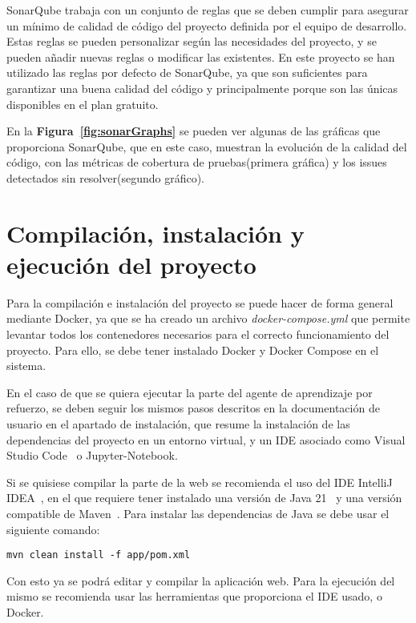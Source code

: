 SonarQube trabaja con un conjunto de reglas que se deben cumplir para asegurar un mínimo de calidad de código del proyecto definida por el equipo de desarrollo. Estas reglas se pueden personalizar según las necesidades del proyecto, y se pueden añadir nuevas reglas o modificar las existentes. En este proyecto se han utilizado las reglas por defecto de SonarQube, ya que son suficientes para garantizar una buena calidad del código y principalmente porque son las únicas disponibles en el plan gratuito.


En la \textbf{Figura~\ref{fig:sonarGraphs}} se pueden ver algunas de las gráficas que proporciona SonarQube, que en este caso, muestran la evolución de la calidad del código, con las métricas de cobertura de pruebas(primera gráfica) y los issues detectados sin resolver(segundo gráfico). 

\section{Compilación, instalación y ejecución del proyecto}
\label{sec:compilacion}
Para la compilación e instalación del proyecto se puede hacer de forma general mediante Docker, ya que se ha creado un archivo \textit{docker-compose.yml} que permite levantar todos los contenedores necesarios para el correcto funcionamiento del proyecto. Para ello, se debe tener instalado Docker y Docker Compose en el sistema.

En el caso de que se quiera ejecutar la parte del agente de aprendizaje por refuerzo, se deben  seguir los mismos pasos descritos en la documentación de usuario en el apartado de instalación, que resume la instalación de las dependencias del proyecto en un entorno virtual, y un IDE asociado como Visual Studio Code~\cite{VSCode} o Jupyter-Notebook.

Si se quisiese compilar la parte de la web se recomienda el uso del IDE IntelliJ IDEA~\cite{intel}, en el que requiere tener instalado una versión de Java 21~\cite{java} y una versión compatible de Maven~\cite{maven}. Para instalar las dependencias de Java se debe usar el siguiente comando:
\begin{verbatim}
mvn clean install -f app/pom.xml
\end{verbatim}
Con esto ya se podrá editar y compilar la aplicación web. Para la ejecución del mismo se recomienda usar las herramientas que proporciona el IDE usado, o Docker.

